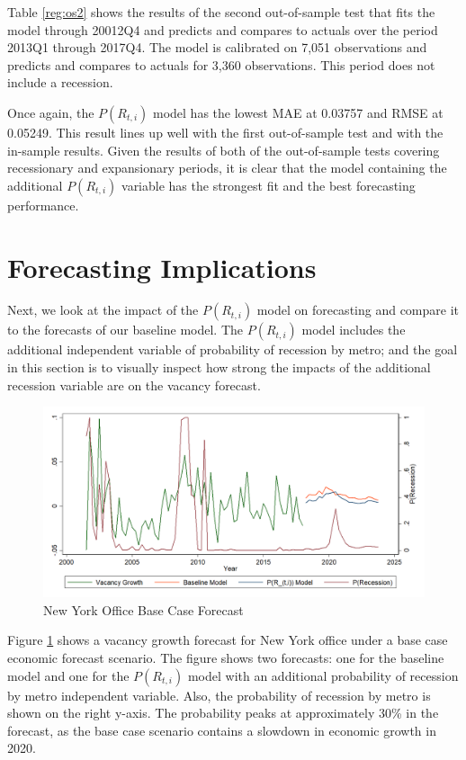 \documentclass[10pt]{article}
\begin{document}
Table \ref{reg:os2} shows the results of the second out-of-sample test that fits the model through 20012Q4 and predicts and compares to actuals over the period 2013Q1 through 2017Q4.  The model is calibrated on 7,051 observations and predicts and compares to actuals for 3,360 observations.  This period does not include a recession.

Once again, the $P(R_{t,i})$ model has the lowest MAE at 0.03757 and RMSE at 0.05249.  This result lines up well with the first out-of-sample test and with the in-sample results.  Given the results of both of the out-of-sample tests covering recessionary and expansionary periods, it is clear that the model containing the additional $P(R_{t,i})$ variable has the strongest fit and the best forecasting performance.

\section*{Forecasting Implications}

Next, we look at the impact of the $P(R_{t,i})$ model on forecasting and compare it to the forecasts of our baseline model.  The $P(R_{t,i})$ model includes the additional independent variable of probability of recession by metro; and the goal in this section is to visually inspect how strong the impacts of the additional recession variable are on the vacancy forecast.

\begin{figure}[h]
\begin{center}
\caption{New York Office Base Case Forecast} \label{fig:newy-fc-1}
\includegraphics[scale=0.22]{newyoff-forecast-simid1-2.png}
\end{center}
\end{figure}

Figure \ref{fig:newy-fc-1} shows a vacancy growth forecast for New York office under a base case economic forecast scenario.  The figure shows two forecasts: one for the baseline model and one for the $P(R_{t,i})$ model with an additional probability of recession by metro independent variable.  Also, the probability of recession by metro is shown on the right y-axis.  The probability peaks at approximately 30\% in the forecast, as the base case scenario contains a slowdown in economic growth in 2020.
\end{document}
